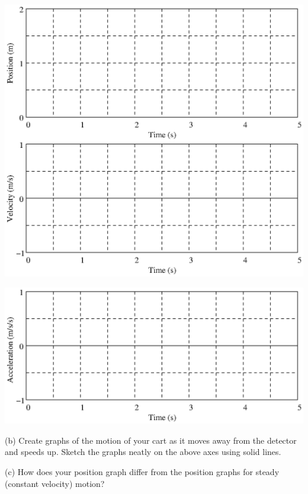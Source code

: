 \vspace{0.3cm}
{\par\centering \includegraphics{changing_fig1.eps} \par}
\vspace{0.3cm}

\vspace{0.3cm}
{\par\centering \includegraphics{changing_fig2.eps} \par}
\vspace{0.3cm}

(b) Create graphs of the motion of your cart as it moves away from the detector
and speeds up. Sketch the graphs neatly on the above axes using solid lines.

(c) How does your position graph differ from the position graphs for steady
(constant velocity) motion? 
\vspace{13mm}

